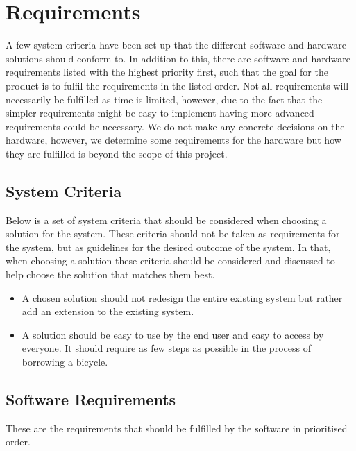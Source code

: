 \section{Requirements}
A few system criteria have been set up that the different software and hardware solutions should conform to. 
In addition to this, there are software and hardware requirements listed with the highest priority first, such that the goal for the product is to fulfil the requirements in the listed order. 
Not all requirements will necessarily be fulfilled as time is limited, however, due to the fact that the simpler requirements might be easy to implement having more advanced requirements could be necessary.
We do not make any concrete decisions on the hardware, however, we determine some requirements for the hardware but how they are fulfilled is beyond the scope of this project.

\subsection{System Criteria}\label{sec:systemCriteria}
Below is a set of system criteria that should be considered when choosing a solution for the system.
These criteria should not be taken as requirements for the system, but as guidelines for the desired outcome of the system.
In that, when choosing a solution these criteria should be considered and discussed to help choose the solution that matches them best.

\begin{itemize}
	\item A chosen solution should not redesign the entire existing system but rather add an extension to the existing system.
	\item A solution should be easy to use by the end user and easy to access by everyone. 
	It should require as few steps as possible in the process of borrowing a bicycle.
\end{itemize}

\subsection{Software Requirements}
These are the requirements that should be fulfilled by the software in prioritised order.

